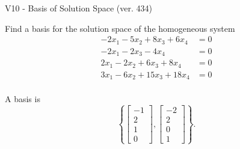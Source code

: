 \begin{exercise}
  \begin{exerciseTitle}V10 - Basis of Solution Space (ver. 434)\end{exerciseTitle}
  \begin{exerciseStatement}
    Find a basis for the solution space of the homogeneous system 
\begin{align*}
 -2 x_ 1 -5 x_ 2 + 8 x_ 3 + 6 x_ 4 &= 0  \\ 
  -2 x_ 1 -2 x_ 3 -4 x_ 4 &= 0  \\ 
  2 x_ 1 -2 x_ 2 + 6 x_ 3 + 8 x_ 4 &= 0  \\ 
  3 x_ 1 -6 x_ 2 + 15 x_ 3 + 18 x_ 4 &= 0  \\ 
 \end{align*}


 
  \end{exerciseStatement}

  \begin{exerciseAnswer}
   A basis is   
\[\left\{\left[\begin{array}{c}
-1 \\
2 \\
1 \\
0
\end{array}\right] , \left[\begin{array}{c}
-2 \\
2 \\
0 \\
1
\end{array}\right]\right\}.\]

  


  \end{exerciseAnswer}
\end{exercise}